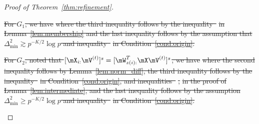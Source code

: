 \documentclass[lettersize,onecolumn,journal]{IEEEtran}
\theoremstyle{definition}
\theoremstyle{definition}
\newcommand{\of}[1]{\left(#1\right)}
\newcommand{\aabs}[1]{\left|#1\right|}
\providecommand{\DIFdeltex}[1]{{\protect\color{red}\sout{#1}}}                      %
\providecommand{\DIFdel}[1]{\texorpdfstring{\DIFdeltex{#1}}{}} %
\begin{document}
\begin{proof}[Proof of Theorem~\ref{thm:refinement}]
\begin{enumerate}
\DIFdel{For $G_1$, we have 
    }%
\DIFdel{where the third inequality follows by the inequality~}%
\DIFdel{in Lemma~\ref{lem:membership} and the last inequality follows by the assumption that $\Delta_{\min}^2 \gtrsim p^{-K/2}\log p$ and inequality~}%
\DIFdel{in Condition~\ref{cond:origin}.
    }%

\DIFdel{For $G_2$, noted that $[\mX_{i:} \mV^{(t)}]^s = [ \mW_{z(i):}^T\mX \mV^{(t)}]^s$, we have 
    }%
\DIFdel{where the second inequality follows by Lemma~\ref{lem:norm_diff}, the third inequality follows by the inequality~}%
\DIFdel{in Condition~\ref{cond:origin}, and inequalities~}%
\DIFdel{, }%
\DIFdel{in the proof of Lemma~\ref{lem:intermediate},  and the last inequality follows by the assumption $\Delta_{\min}^2 \geq p^{-K/2} \log p$ and inequality~}%
\DIFdel{in Condition~\ref{cond:origin}.
    }%


\end{enumerate}
\end{proof}
\end{document}
